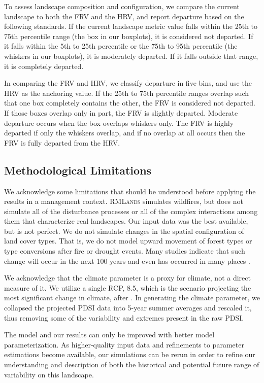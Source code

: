 \documentclass[12pt]{article}
\begin{document}
\begin{spacing}{1}
To assess landscape composition and configuration, we compare the current landscape to both the FRV and the HRV, and report departure based on the following standards. If the current landscape metric value falls within the 25th to 75th percentile range (the box in our boxplots), it is considered not departed. If it falls within the 5th to 25th percentile or the 75th to 95th percentile (the whiskers in our boxplots), it is moderately departed. If it falls outside that range, it is completely departed.

In comparing the FRV and HRV, we classify departure in five bins, and use the HRV as the anchoring value. If the 25th to 75th percentile ranges overlap such that one box completely contains the other, the FRV is considered not departed. If those boxes overlap only in part, the FRV is slightly departed. Moderate departure occurs when the box overlaps whiskers only. The FRV is highly departed if only the whiskers overlap, and if no overlap at all occurs then the FRV is fully departed from the HRV.


\subsection*{Methodological Limitations}
We acknowledge some limitations that should be understood before applying the results in a management context. \textsc{RMLands} simulates wildfires, but does not simulate all of the disturbance processes or all of the complex interactions among them that characterize real landscapes. Our input data was the best available, but is not perfect. We do not simulate changes in the spatial configuration of land cover types. That is, we do not model upward movement of forest types or type conversions after fire or drought events. Many studies indicate that such change will occur in the next 100 years and even has occurred in many places \citep{Bachelet2001}. 

We acknowledge that the climate parameter is a proxy for climate, not a direct measure of it. We utilize a single RCP, 8.5, which is the scenario projecting the most significant change in climate, after \citet{Cook2014}. In generating the climate parameter, we collapsed the projected PDSI data into 5-year summer averages and rescaled it, thus removing some of the variability and extremes present in the raw PDSI.

The model and our results can only be improved with better model parameterization. As higher-quality input data and refinements to parameter estimations become available, our simulations can be rerun in order to refine our understanding and description of both the historical and potential future range of variability on this landscape.












\end{spacing}
\end{document}
